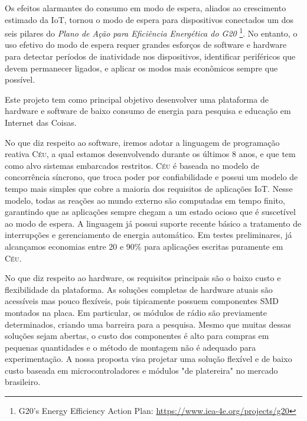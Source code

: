 \documentclass[titlepage,12pt]{article}
\newcommand{\CEU}{\textsc{C\'{e}u}\xspace}
\begin{document}
Os efeitos alarmantes do consumo em modo de espera, aliados ao crescimento
estimado da IoT, tornou o modo de espera para dispositivos conectados um dos
seis pilares do \emph{Plano de Ação para Eficiência Energética do G20}%
\footnote{G20's Energy Efficiency Action Plan: \url{https://www.iea-4e.org/projects/g20}}.
No entanto, o uso efetivo do modo de espera requer grandes esforços de software
e hardware para detectar períodos de inatividade nos dispositivos, identificar
periféricos que devem permanecer ligados, e aplicar os modos mais econômicos
sempre que possível.

Este projeto tem como principal objetivo desenvolver uma plataforma de hardware
e software de baixo consumo de energia para pesquisa e educação em Internet das
Coisas.

No que diz respeito ao software, iremos adotar a linguagem de programação
reativa \CEU, a qual estamos desenvolvendo durante os últimos 8 anos, e que tem
como alvo sistemas embarcados restritos.
%
\CEU é baseada no modelo de concorrência síncrono, que troca poder por
confiabilidade e possui um modelo de tempo mais simples que cobre a maioria dos
requisitos de aplicações IoT.
%
Nesse modelo, todas as reações ao mundo externo são computadas em tempo finito,
garantindo que as aplicações sempre chegam a um estado ocioso que é suscetível
ao modo de espera.
%
A linguagem já possui suporte recente básico a tratamento de interrupções e
gerenciamento de energia automático.
Em testes preliminares, já alcançamos economias entre 20 e 90\% para aplicações
escritas puramente em \CEU.

No que diz respeito ao hardware, os requisitos principais são o baixo custo e
flexibilidade da plataforma.
%
As soluções completas de hardware atuais são acessíveis mas pouco flexíveis,
pois tipicamente possuem componentes SMD montados na placa.
Em particular, os módulos de rádio são previamente determinados, criando uma
barreira para a pesquisa.
Mesmo que muitas dessas soluções sejam abertas, o custo dos componentes é alto
para compras em pequenas quantidades e o método de montagem não é adequado para
experimentação.
%
A nossa proposta visa projetar uma solução flexível e de baixo custo baseada em
microcontroladores e módulos "de platereira" no mercado brasileiro.

\end{document}
